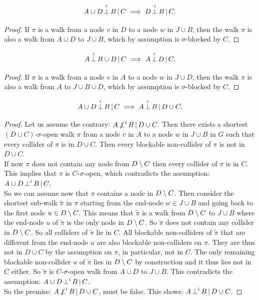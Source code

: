 \begin{Lem}
    \[ A \cup D \operatorname*{\perp}^i  B \operatorname*{|} C \implies D \operatorname*{\perp}^i  B \operatorname*{|} C.\]
\begin{proof}
If $\pi$ is a walk from a node $v$ in $D$ to a node $w$ in $J \cup B$, then 
the walk $\pi$ is also a walk from $A \cup D$ to $J \cup B$, which by assumption is $\sigma$-blocked by $C$.
\end{proof}
\end{Lem}

\begin{Lem}
    \[ A \operatorname*{\perp}^i  B \cup D\operatorname*{|} C  \implies A \operatorname*{\perp}^i  D \operatorname*{|} C.\]
\begin{proof}
If $\pi$ is a walk from a node $v$ in $A$ to a node $w$ in $J \cup D$, then %
the walk  $\pi$ is also a walk from $A$ to $J \cup B \cup D$, which by assumption is $\sigma$-blocked by $C$. 
\end{proof}
\end{Lem}

\begin{Lem}
    \label{s-sep-left-weak-union}
    \[A \cup D \operatorname*{\perp}^i  B  \operatorname*{|} C \implies A \operatorname*{\perp}^i  B \operatorname*{|} D\cup C.\]
\begin{proof}
    Let us assume the contrary:  $A \operatorname*{\not\perp}^i  B \operatorname*{|} D\cup C$. Then there exists a shortest $(D \cup C)$-$\sigma$-open walk $\pi$ 
    from a node $v$ in $A$ to a node $w$ in $J \cup B$ in $G$ such that every collider of $\pi$ is in $D \cup C$.
    Then every blockable non-collider of $\pi$ is not in $D \cup C$.\\
    If now $\pi$ does not contain any node from $D \setminus C$ then every collider of $\pi$ is in $C$. 
    This implies that $\pi$ is $C$-$\sigma$-open, 
    which contradicts the assumption: $A \cup D \operatorname*{\perp}^i  B  \operatorname*{|} C$.\\
    So we can assume now that $\pi$ contains a node in $D \setminus C$. 
    Then consider the shortest sub-walk $\tilde \pi$ in $\pi$ starting from the end-node $w \in J \cup B$ and going back to the first node $u \in D \setminus C$.
    This means that $\tilde \pi$ is a walk from $D \setminus C$ to $J \cup B$ where the end-node $u$ of $\tilde \pi$ is the only node in $D\setminus C$. So $\tilde \pi$ does not contain any collider in $D\setminus C$.
    So all colliders of $\tilde \pi$ lie in $C$. 
    All blockable non-colliders of $\tilde \pi$ that are different from the end-node $u$ are also blockable non-colliders on $\pi$. 
    They are thus not in $D \cup C$ by the assumption on $\pi$, in particular, not in $C$. 
    The only remaining blockable non-collider $u$ of $\tilde \pi$ lies in $D \setminus C$ by construction and it thus lies not in $C$ either.
    So $\tilde \pi$ is $C$-$\sigma$-open walk from $A \cup D$ to $J \cup B$. 
    This contradicts the assumption: $A \cup D \operatorname*{\perp}^i  B  \operatorname*{|} C$. \\
    So the premise: $A \operatorname*{\not\perp}^i  B \operatorname*{|} D\cup C$, must be false. This shows: $A \operatorname*{\perp}^i  B \operatorname*{|} D\cup C$.
\end{proof}
\end{Lem}

